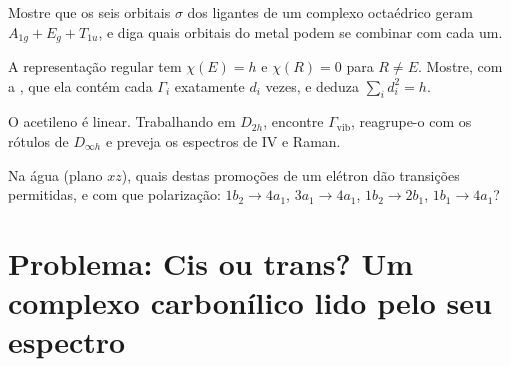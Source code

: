 \begin{exercise}[$\star\star$]\label{exo:b3:group-theory-applied:9}
Mostre que os seis orbitais $\sigma$ dos ligantes de um complexo octaédrico geram
$A_{1g} + E_g + T_{1u}$, e diga quais orbitais do metal podem se combinar com cada um.
\end{exercise}

\begin{exercise}[$\star\star\star$]\label{exo:b3:group-theory-applied:10}
A representação regular tem $\chi(E) = h$ e $\chi(R) = 0$ para $R \ne E$. Mostre,
com a , que ela contém cada 
$\Gamma_i$ exatamente $d_i$ vezes, e deduza $\sum_id_i^2 = h$.
\end{exercise}

\begin{exercise}[$\star\star\star$]\label{exo:b3:group-theory-applied:11}
O acetileno  é linear. Trabalhando em $D_{2h}$, encontre $\Gamma_{\mathrm{vib}}$,
reagrupe-o com os rótulos de $D_{\infty h}$ e preveja os espectros de IV e Raman.
\end{exercise}

\begin{exercise}[$\star\star\star$]\label{exo:b3:group-theory-applied:12}
Na água (plano $xz$), quais destas promoções de um elétron dão transições
permitidas, e com que polarização: $1b_2 \to 4a_1$, $3a_1 \to 4a_1$,
$1b_2 \to 2b_1$, $1b_1 \to 4a_1$?
\end{exercise}

\section{Problema: Cis ou trans? Um complexo carbonílico lido pelo seu espectro}

